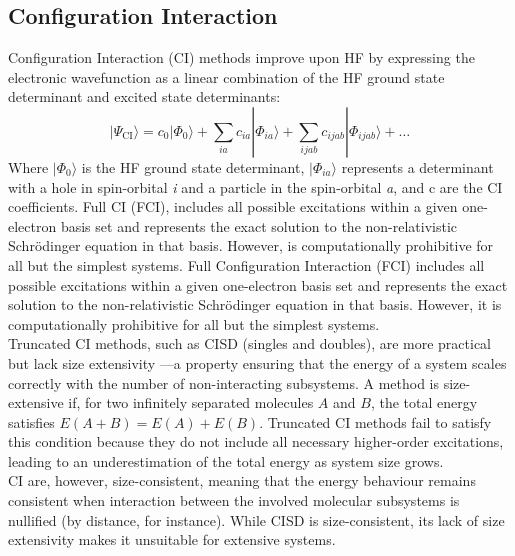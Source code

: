 \subsection{Configuration Interaction}
Configuration Interaction (CI)\cite{shavitt2009many,sherrill1999configuration} methods improve upon HF by expressing the electronic wavefunction as a linear combination of the HF ground state determinant and excited state determinants:
\begin{equation} \label{eq:CI}
     |\Psi_{\mathrm{CI}} \rangle = c_0 |\Phi_0 \rangle + \sum_{ia} c_{ia} |\Phi_{ia} \rangle + \sum_{ijab} c_{ijab} |\Phi_{ijab} \rangle + \dots
\end{equation}
Where $|\Phi_0 \rangle$ is the HF ground state determinant, $|\Phi_{ia} \rangle$ represents a determinant with a hole in spin-orbital \textit{i} and a particle in the spin-orbital \textit{a}, and c are the CI coefficients. Full CI (FCI),  includes all possible excitations within a given one-electron basis set and represents the exact solution to the non-relativistic Schrödinger equation in that basis. However, is computationally prohibitive for all but the simplest systems. Full Configuration Interaction (FCI) includes all possible excitations within a given one-electron basis set and represents the exact solution to the non-relativistic Schrödinger equation in that basis. However, it is computationally prohibitive for all but the simplest systems.\\ Truncated CI methods, such as CISD (singles and doubles), are more practical but lack size extensivity ---a property ensuring that the energy of a system scales correctly with the number of non-interacting subsystems. A method is size-extensive if, for two infinitely separated molecules $A$ and $B$, the total energy satisfies $E(A + B) = E(A) + E(B)$. Truncated CI methods fail to satisfy this condition because they do not include all necessary higher-order excitations, leading to an underestimation of the total energy as system size grows.\\
CI are, however, size-consistent, meaning that the energy behaviour remains consistent when interaction between the involved molecular subsystems is nullified (by distance, for instance). While CISD is size-consistent, its lack of size extensivity makes it unsuitable for extensive systems.


